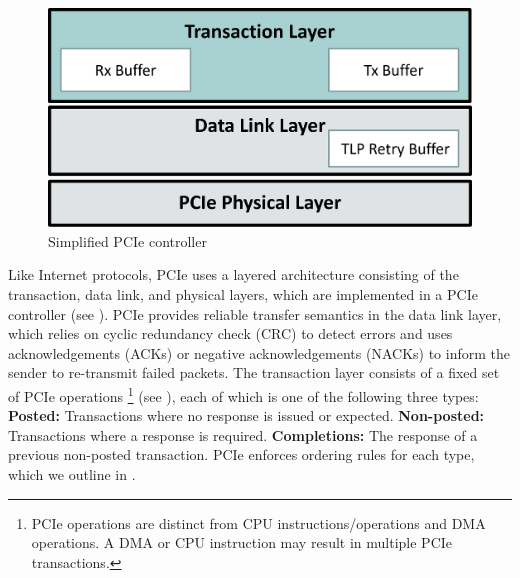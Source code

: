 \begin{figure}[!htb]
    \centering
    \includegraphics[width=\columnwidth]{figures/interconnect-sc/pcie-controller.png}
    \caption{Simplified PCIe controller}
    \label{fig:pcie-controller}
\end{figure}

Like Internet protocols, PCIe uses a layered architecture consisting of the transaction, data link, and physical layers, which are implemented in a PCIe controller (see ).
PCIe provides reliable transfer semantics in the data link layer, which relies on cyclic redundancy check (CRC) to detect errors and uses acknowledgements (ACKs) or negative acknowledgements (NACKs) to inform the sender to re-transmit failed packets.
The transaction layer consists of a fixed set of PCIe operations \footnote{PCIe operations are distinct from CPU instructions/operations and DMA operations.
A DMA or CPU instruction may result in multiple PCIe transactions.} (see ), each of which is one of the following three types:
\textbf{Posted:} Transactions where no response is issued or expected. 
\textbf{Non-posted:} Transactions where a response is required. 
\textbf{Completions:} The response of a previous non-posted transaction.
PCIe enforces ordering rules for each type, which we outline in .

